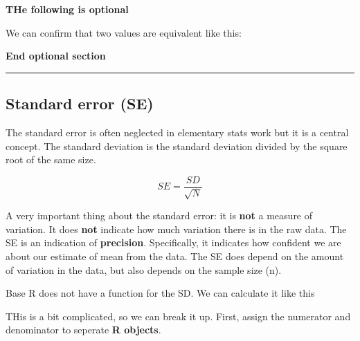 \documentclass[]{book}
\newenvironment{Shaded}{\begin{snugshade}}{\end{snugshade}}
\newcommand{\KeywordTok}[1]{\textcolor[rgb]{0.13,0.29,0.53}{\textbf{#1}}}
\newcommand{\StringTok}[1]{\textcolor[rgb]{0.31,0.60,0.02}{#1}}
\newcommand{\OperatorTok}[1]{\textcolor[rgb]{0.81,0.36,0.00}{\textbf{#1}}}
\newcommand{\NormalTok}[1]{#1}
\theoremstyle{definition}
\theoremstyle{definition}
\theoremstyle{definition}
\theoremstyle{remark}
\begin{document}
\textbf{THe following is optional}

We can confirm that two values are equivalent like this:

\begin{Shaded}
\end{Shaded}

\textbf{End optional section}

\begin{center}\rule{0.5\linewidth}{\linethickness}\end{center}

\subsection{Standard error (SE)}\label{standard-error-se}

The standard error is often neglected in elementary stats work but it is
a central concept. The standard deviation is the standard deviation
divided by the square root of the same size.

\[SE = \frac{SD}{\sqrt{N}}\]

A very important thing about the standard error: it is \textbf{not} a
measure of variation. It does \textbf{not} indicate how much variation
there is in the raw data. The SE is an indication of \textbf{precision}.
Specifically, it indicates how confident we are about our estimate of
mean from the data. The SE does depend on the amount of variation in the
data, but also depends on the sample size (n).

Base R does not have a function for the SD. We can calculate it like
this

\begin{Shaded}
\end{Shaded}

THis is a bit complicated, so we can break it up. First, assign the
numerator and denominator to seperate \textbf{R objects}.
\end{document}
